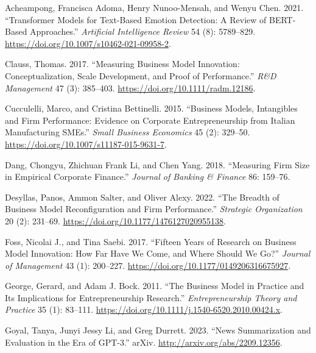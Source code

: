 \documentclass[
]{article}
\newlength{\cslhangindent}
\newenvironment{CSLReferences}[2] %
 {\begin{list}{}{%
  \setlength{\itemindent}{0pt}
  \setlength{\leftmargin}{0pt}
  \setlength{\parsep}{0pt}
  \ifodd #1
   \setlength{\leftmargin}{\cslhangindent}
   \setlength{\itemindent}{-1\cslhangindent}
  \fi
  \setlength{\itemsep}{#2\baselineskip}}}
 {\end{list}}
\begin{document}
\label{refs}
\begin{CSLReferences}{1}{0}
Acheampong, Francisca Adoma, Henry Nunoo-Mensah, and Wenyu Chen. 2021.
{``Transformer Models for Text-Based Emotion Detection: A Review of
{BERT}-Based Approaches.''} \emph{Artificial Intelligence Review} 54
(8): 5789--829. \url{https://doi.org/10.1007/s10462-021-09958-2}.

Clauss, Thomas. 2017. {``Measuring Business Model Innovation:
Conceptualization, Scale Development, and Proof of Performance.''}
\emph{R\&D Management} 47 (3): 385--403.
\url{https://doi.org/10.1111/radm.12186}.

Cucculelli, Marco, and Cristina Bettinelli. 2015. {``Business Models,
Intangibles and Firm Performance: Evidence on Corporate Entrepreneurship
from {Italian} Manufacturing {SMEs}.''} \emph{Small Business Economics}
45 (2): 329--50. \url{https://doi.org/10.1007/s11187-015-9631-7}.

Dang, Chongyu, Zhichuan Frank Li, and Chen Yang. 2018. {``Measuring Firm
Size in Empirical Corporate Finance.''} \emph{Journal of Banking \&
Finance} 86: 159--76.

Desyllas, Panos, Ammon Salter, and Oliver Alexy. 2022. {``The Breadth of
Business Model Reconfiguration and Firm Performance.''} \emph{Strategic
Organization} 20 (2): 231--69.
\url{https://doi.org/10.1177/1476127020955138}.

Foss, Nicolai J., and Tina Saebi. 2017. {``Fifteen {Years} of {Research}
on {Business} {Model} {Innovation}: {How} {Far} {Have} {We} {Come}, and
{Where} {Should} {We} {Go}?''} \emph{Journal of Management} 43 (1):
200--227. \url{https://doi.org/10.1177/0149206316675927}.

George, Gerard, and Adam J. Bock. 2011. {``The {Business} {Model} in
{Practice} and Its {Implications} for {Entrepreneurship} {Research}.''}
\emph{Entrepreneurship Theory and Practice} 35 (1): 83--111.
\url{https://doi.org/10.1111/j.1540-6520.2010.00424.x}.

Goyal, Tanya, Junyi Jessy Li, and Greg Durrett. 2023. {``News
{Summarization} and {Evaluation} in the {Era} of {GPT}-3.''} arXiv.
\url{http://arxiv.org/abs/2209.12356}.


\end{CSLReferences}
\end{document}
